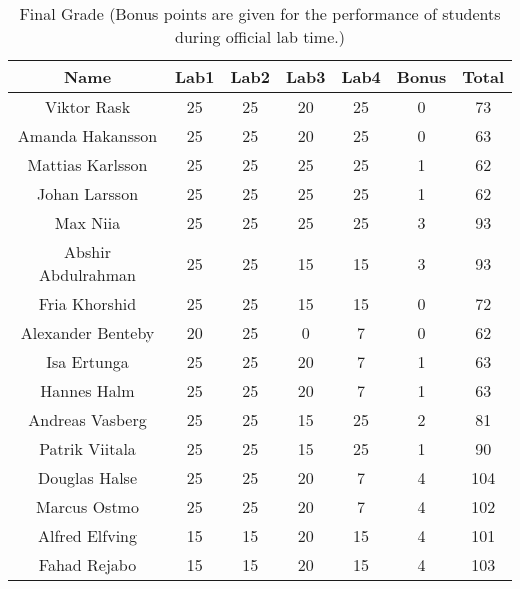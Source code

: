 \documentclass{article}
\begin{document}
\begin{table}[ht]
\caption{Final Grade (Bonus points are given for the performance of students during official lab time.)}
\centering
\begin{tabular}{c c c c c c c} 
\hline\hline 
Name & Lab1 & Lab2 & Lab3 & Lab4 & Bonus & Total \\ [0.5ex] 
\hline
Viktor Rask
& 25 & 25 & 20 & 25 & 0 & 73 \\
\hline
Amanda Hakansson 
& 25 & 25 & 20 & 25 & 0 & 63 \\
\hline
Mattias Karlsson
& 25 & 25 & 25 & 25 & 1 & 62 \\
\hline 
Johan Larsson
& 25 & 25 & 25 & 25 & 1 & 62 \\
\hline 
Max Niia
& 25 & 25 & 25 & 25 & 3 & 93 \\
\hline 
Abshir Abdulrahman
& 25 & 25 & 15 & 15 & 3 & 93 \\
\hline
Fria Khorshid
& 25 & 25 & 15 & 15 & 0 & 72 \\
\hline
Alexander Benteby
& 20 & 25 & 0 & 7 & 0 & 62 \\
\hline
Isa Ertunga
& 25 & 25 & 20 & 7 & 1 & 63 \\
\hline
Hannes Halm
& 25 & 25 & 20 & 7 & 1 & 63 \\
\hline 
Andreas Vasberg
& 25 & 25 & 15 & 25 & 2 & 81 \\
\hline 
Patrik Viitala
& 25 & 25 & 15 & 25 & 1 & 90 \\  
\hline
Douglas Halse
& 25 & 25 & 20 & 7 & 4 & 104 \\
\hline
Marcus Ostmo
& 25 & 25 & 20 & 7 & 4 & 102 \\ 
\hline
Alfred Elfving
& 15 & 15 & 20 & 15 & 4 & 101 \\
\hline
Fahad Rejabo
& 15 & 15 & 20 & 15 & 4 & 103 \\
\hline
\end{tabular}
\label{table:nonlin}
\end{table}
\end{document}
